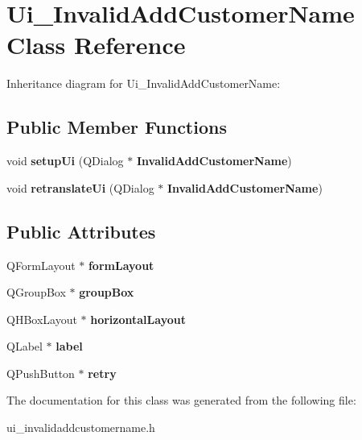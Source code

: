 \section{Ui\+\_\+\+Invalid\+Add\+Customer\+Name Class Reference}
\label{class_ui___invalid_add_customer_name}


Inheritance diagram for Ui\+\_\+\+Invalid\+Add\+Customer\+Name\+:
\subsection*{Public Member Functions}
\begin{DoxyCompactItemize}
\item 
\mbox{\label{class_ui___invalid_add_customer_name_a02665e7de10cc012d62864f0a3c92823}} 
void {\bfseries setup\+Ui} (Q\+Dialog $\ast$\textbf{ Invalid\+Add\+Customer\+Name})
\item 
\mbox{\label{class_ui___invalid_add_customer_name_a4a7c0e46f22b95ad5997c98dc7936ab5}} 
void {\bfseries retranslate\+Ui} (Q\+Dialog $\ast$\textbf{ Invalid\+Add\+Customer\+Name})
\end{DoxyCompactItemize}
\subsection*{Public Attributes}
\begin{DoxyCompactItemize}
\item 
\mbox{\label{class_ui___invalid_add_customer_name_ae788aca71f3f5297fa82ff664f229e2f}} 
Q\+Form\+Layout $\ast$ {\bfseries form\+Layout}
\item 
\mbox{\label{class_ui___invalid_add_customer_name_a15a1d6b1544a42c196b87999f4fe1be7}} 
Q\+Group\+Box $\ast$ {\bfseries group\+Box}
\item 
\mbox{\label{class_ui___invalid_add_customer_name_a177e8c50610f9af133213ecc23308874}} 
Q\+H\+Box\+Layout $\ast$ {\bfseries horizontal\+Layout}
\item 
\mbox{\label{class_ui___invalid_add_customer_name_af0de7fb03f9aeb72af09e9b4705b3d8f}} 
Q\+Label $\ast$ {\bfseries label}
\item 
\mbox{\label{class_ui___invalid_add_customer_name_a6b0ad598354c4cd677fd4d3e36efed45}} 
Q\+Push\+Button $\ast$ {\bfseries retry}
\end{DoxyCompactItemize}


The documentation for this class was generated from the following file\+:\begin{DoxyCompactItemize}
\item 
ui\+\_\+invalidaddcustomername.\+h\end{DoxyCompactItemize}

